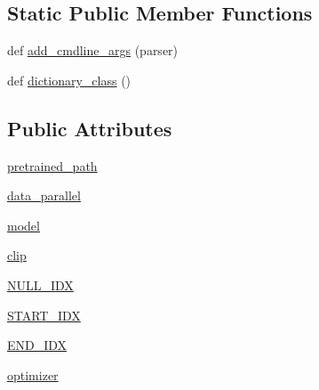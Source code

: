 \subsection*{Static Public Member Functions}
\begin{DoxyCompactItemize}
\item 
def \hyperlink{classparlai_1_1agents_1_1bert__ranker_1_1cross__encoder__ranker_1_1CrossEncoderRankerAgent_a15c4f37715a216f5a4f37f5dbcb446f5}{add\+\_\+cmdline\+\_\+args} (parser)
\item 
def \hyperlink{classparlai_1_1agents_1_1bert__ranker_1_1cross__encoder__ranker_1_1CrossEncoderRankerAgent_a0518d01be6a05fc2bc117f2c55cb6328}{dictionary\+\_\+class} ()
\end{DoxyCompactItemize}
\subsection*{Public Attributes}
\begin{DoxyCompactItemize}
\item 
\hyperlink{classparlai_1_1agents_1_1bert__ranker_1_1cross__encoder__ranker_1_1CrossEncoderRankerAgent_a0e3cab83007745383449162abf3e68d4}{pretrained\+\_\+path}
\item 
\hyperlink{classparlai_1_1agents_1_1bert__ranker_1_1cross__encoder__ranker_1_1CrossEncoderRankerAgent_a073fbd49c70b53a4a152a204fc5b4240}{data\+\_\+parallel}
\item 
\hyperlink{classparlai_1_1agents_1_1bert__ranker_1_1cross__encoder__ranker_1_1CrossEncoderRankerAgent_aa61dee97328ecd3c43cc8f1d6d472c6f}{model}
\item 
\hyperlink{classparlai_1_1agents_1_1bert__ranker_1_1cross__encoder__ranker_1_1CrossEncoderRankerAgent_a07990f2aca9e4da9d38ab8b70830a48f}{clip}
\item 
\hyperlink{classparlai_1_1agents_1_1bert__ranker_1_1cross__encoder__ranker_1_1CrossEncoderRankerAgent_afa32c6bdd2b271f3f3d0b823e65397c2}{N\+U\+L\+L\+\_\+\+I\+DX}
\item 
\hyperlink{classparlai_1_1agents_1_1bert__ranker_1_1cross__encoder__ranker_1_1CrossEncoderRankerAgent_a1cf7d4af340ca8e9d2cf90b59e9e5db0}{S\+T\+A\+R\+T\+\_\+\+I\+DX}
\item 
\hyperlink{classparlai_1_1agents_1_1bert__ranker_1_1cross__encoder__ranker_1_1CrossEncoderRankerAgent_ae432d83f3269252d6d58dafd3531b14b}{E\+N\+D\+\_\+\+I\+DX}
\item 
\hyperlink{classparlai_1_1agents_1_1bert__ranker_1_1cross__encoder__ranker_1_1CrossEncoderRankerAgent_a3b29d2ab93c866246f0d53298d3fd0fb}{optimizer}
\end{DoxyCompactItemize}
